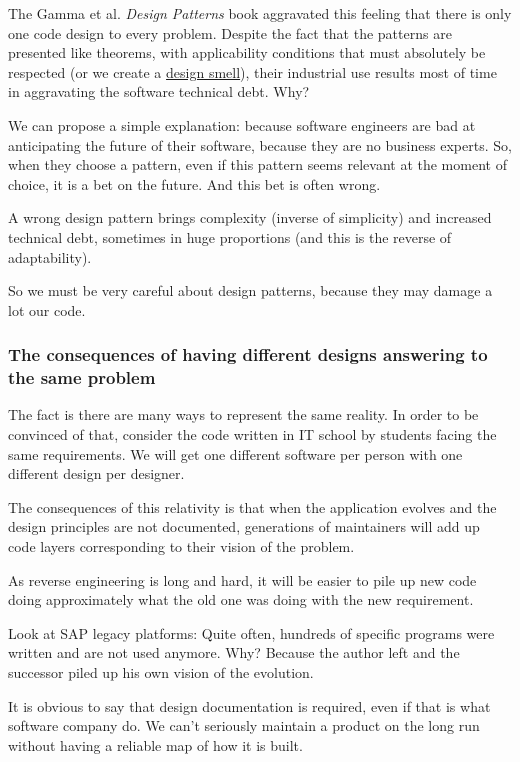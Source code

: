\documentclass[]{article}
\begin{document}
The Gamma et al. \emph{Design Patterns} book aggravated this feeling that there is only one code design to every problem. Despite the fact that the patterns are presented like theorems, with applicability conditions that must absolutely be respected (or we create a \href{https://en.wikipedia.org/wiki/Design_smell}{design smell}), their industrial use results most of time in aggravating the software technical debt. Why?

We can propose a simple explanation: because software engineers are bad at anticipating the future of their software, because they are no business experts. So, when they choose a pattern, even if this pattern seems relevant at the moment of choice, it is a bet on the future. And this bet is often wrong.

A wrong design pattern brings complexity (inverse of simplicity) and increased technical debt, sometimes in huge proportions (and this is the reverse of adaptability).

So we must be very careful about design patterns, because they may damage a lot our code.

\subsubsection{The consequences of having different designs answering to the same problem}

The fact is there are many ways to represent the same reality. In order to be convinced of that, consider the code written in IT school by students facing the same requirements. We will get one different software per person with one different design per designer.

The consequences of this relativity is that when the application evolves and the design principles are not documented, generations of maintainers will add up code layers corresponding to their vision of the problem.

As reverse engineering is long and hard, it will be easier to pile up new code doing approximately what the old one was doing with the new requirement.

Look at SAP legacy platforms: Quite often, hundreds of specific programs were written and are not used anymore. Why? Because the author left and the successor piled up his own vision of the evolution.

It is obvious to say that design documentation is required, even if that is what software company do. We can't seriously maintain a product on the long run without having a reliable map of how it is built.
\end{document}
